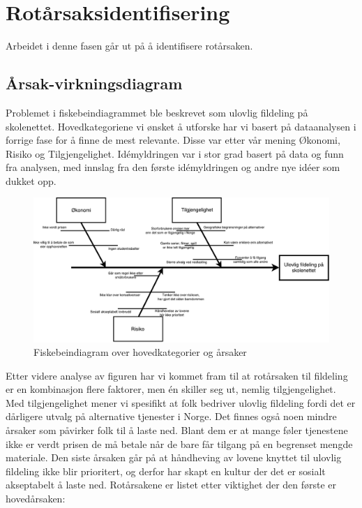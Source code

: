 \section{Rotårsaksidentifisering}
Arbeidet i denne fasen går ut på å identifisere rotårsaken.

\subsection{Årsak-virkningsdiagram}
Problemet i fiskebeindiagrammet ble beskrevet som ulovlig fildeling på skolenettet. Hovedkategoriene vi ønsket å utforske har vi basert på dataanalysen i forrige fase for å finne de mest relevante. Disse var etter vår mening Økonomi, Risiko og Tilgjengelighet. Idémyldringen var i stor grad basert på data og funn fra analysen, med innslag fra den første idémyldringen og andre nye idéer som dukket opp.

\begin{figure}[H]
    \centering
    \includegraphics[scale=0.5]{case_1/bilder/fiskebein.pdf}
    \caption[Fiskebeindiagram over hovedkategorier og årsaker]{Fiskebeindiagram over hovedkategorier og årsaker}
    \label{fig:case1-fiskebein}
\end{figure}

Etter videre analyse av figuren har vi kommet fram til at rotårsaken til fildeling er en kombinasjon flere faktorer, men én skiller seg ut, nemlig tilgjengelighet. Med tilgjengelighet mener vi spesifikt at folk bedriver ulovlig fildeling fordi det er dårligere utvalg på alternative tjenester i Norge. Det finnes også noen mindre årsaker som påvirker folk til å laste ned. Blant dem er at mange føler tjenestene ikke er verdt prisen de må betale når de bare får tilgang på en begrenset mengde materiale. Den siste årsaken går på at håndheving av lovene knyttet til ulovlig fildeling ikke blir prioritert, og derfor har skapt en kultur der det er sosialt akseptabelt å laste ned. Rotårsakene er listet etter viktighet der den første er hovedårsaken:

